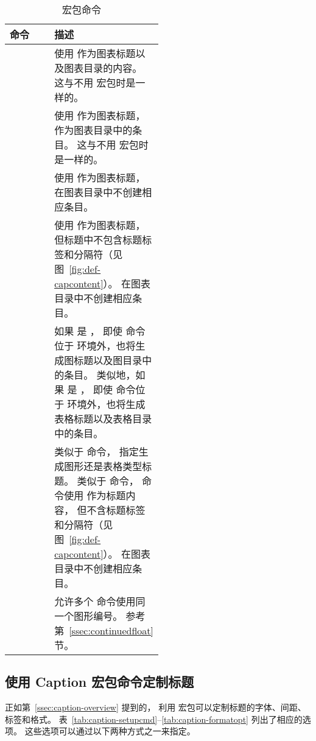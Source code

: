 \begin{sidewaystable}
\centering
\caption{ 宏包命令}\label{tab:caption-cmd}
\begin{tabular}{l P{0.5\linewidth}}
	\toprule
	命令 & 描述 \\
	\midrule
	 & 
	使用  作为图表标题以及图表目录的内容。
	这与不用  宏包时是一样的。 \\
	 & 
	使用  作为图表标题， 作为图表目录中的条目。
	这与不用  宏包时是一样的。 \\
	 & 
	使用  作为图表标题，在图表目录中不创建相应条目。\\
	 & 
	使用  作为图表标题，但标题中不包含标题标签和分隔符（见图~\ref{fig:def-capcontent}）。
	在图表目录中不创建相应条目。\\
	 & 
	如果  是 ，
	即使  命令位于  环境外，也将生成图标题以及图目录中的条目。
	类似地，如果  是 ，
	即使  命令位于  环境外，也将生成表格标题以及表格目录中的条目。\\
	 &
	类似于  命令， 指定生成图形还是表格类型标题。
	类似于  命令， 命令使用  作为标题内容，
	但不含标题标签和分隔符（见图~\ref{fig:def-capcontent}）。
	在图表目录中不创建相应条目。\\
	 &
	允许多个  命令使用同一个图形编号。
	参考第~\ref{ssec:continuedfloat} 节。\\
	\bottomrule
\end{tabular}
\end{sidewaystable}


\subsection{使用 Caption 宏包命令定制标题} \label{ssec:caption-custom}

正如第~\ref{ssec:caption-overview} 提到的，
利用  宏包可以定制标题的字体、间距、标签和格式。
表~\ref{tab:caption-setupcmd}--\ref{tab:caption-formatopt} 列出了相应的选项。
这些选项可以通过以下两种方式之一来指定。

